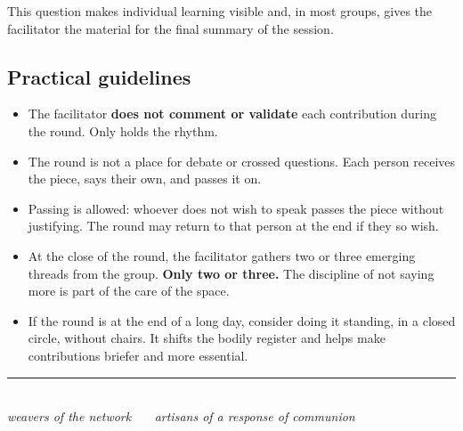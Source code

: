 \documentclass[11pt, a4paper]{article}
\begin{document}
\vspace{0.5em}

This question makes individual learning visible and, in most groups, gives the facilitator the material for the final summary of the session.

\subsection*{Practical guidelines}

\begin{itemize}
  \item The facilitator \textbf{does not comment or validate} each contribution during the round. Only holds the rhythm.
  \item The round is not a place for debate or crossed questions. Each person receives the piece, says their own, and passes it on.
  \item Passing is allowed: whoever does not wish to speak passes the piece without justifying. The round may return to that person at the end if they so wish.
  \item At the close of the round, the facilitator gathers two or three emerging threads from the group. \textbf{Only two or three.} The discipline of not saying more is part of the care of the space.
  \item If the round is at the end of a long day, consider doing it standing, in a closed circle, without chairs. It shifts the bodily register and helps make contributions briefer and more essential.
\end{itemize}

\vspace{2em}

\begin{center}
{\color{regla}\rule{0.35\linewidth}{0.5pt}}\\
\vspace{0.6em}
{\color{tenue}\itshape\small weavers of the network \ \textbullet\ \ artisans of a response of communion}
\end{center}
\end{document}
